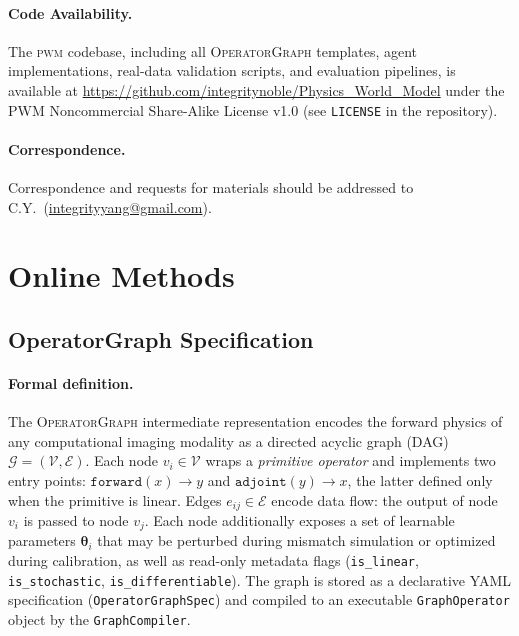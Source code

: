 \documentclass[11pt]{article}
\newcommand{\pwm}{\textsc{pwm}}
\newcommand{\opg}{\textsc{OperatorGraph}}
\begin{document}
\paragraph{Code Availability.}
The \pwm{} codebase, including all \opg{} templates, agent implementations, real-data validation scripts, and evaluation pipelines, is available at \url{https://github.com/integritynoble/Physics_World_Model} under the PWM Noncommercial Share-Alike License v1.0 (see \texttt{LICENSE} in the repository).

\paragraph{Correspondence.}
Correspondence and requests for materials should be addressed to C.Y.\ (\url{integrityyang@gmail.com}).


\section*{Online Methods}

\subsection*{OperatorGraph Specification}
\label{sec:methods:operatorgraph}

\paragraph{Formal definition.}
The \opg{} intermediate representation encodes the forward physics of any
computational imaging modality as a directed acyclic graph (DAG)
$\mathcal{G} = (\mathcal{V}, \mathcal{E})$.
Each node $v_i \in \mathcal{V}$ wraps a \emph{primitive operator} and
implements two entry points: $\texttt{forward}(x) \to y$ and
$\texttt{adjoint}(y) \to x$, the latter defined only when the primitive
is linear.  Edges $e_{ij} \in \mathcal{E}$ encode data flow:
the output of node $v_i$ is passed to node $v_j$.
Each node additionally exposes a set of learnable parameters
$\boldsymbol{\theta}_i$ that may be perturbed during mismatch simulation
or optimized during calibration, as well as read-only metadata flags
(\texttt{is\_linear}, \texttt{is\_stochastic}, \texttt{is\_differentiable}).
The graph is stored as a declarative YAML specification
(\texttt{OperatorGraphSpec}) and compiled to an executable
\texttt{GraphOperator} object by the \texttt{GraphCompiler}.
\end{document}
